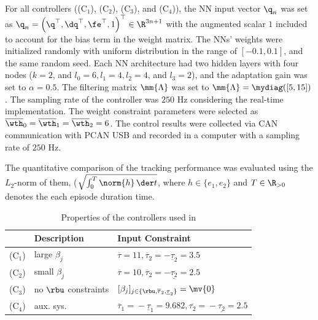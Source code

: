 \documentclass[lettersize,journal]{IEEEtran}
\begin{document}
\hfill

For all controllers ((C$_1$), (C$_2$), (C$_3$), and (C$_4$)), the NN input vector ${\q}_n$ was set as ${\q}_n=\left(\q^\top,\dq^\top,\fe^\top,1\right)^\top\in\R^{3n+1}$ with the augmented scalar $1$ included to account for the bias term in the weight matrix. 
The NNs' weights were initialized randomly with uniform distribution in the range of $[-0.1,0.1]$, and the same random seed.
Each NN architecture had two hidden layers with four nodes (\ie $k=2$, and $l_0=6, l_1=4, l_2=4$, and $l_3=2$), and the adaptation gain was set to $\alpha=0.5$.
The filtering matrix $\mm{\Lambda}$ was set to $\mm{\Lambda}=\mydiag([5,15])$.
The sampling rate of the controller was $250$ Hz considering the real-time implementation.
The weight constraint parameters were selected as $\overline\wth_0=\overline\wth_1=\overline\wth_2=6$. 
The control results were collected via CAN communication with PCAN USB  and recorded in a computer with a sampling rate of $250$ Hz.

The quantitative comparison of the tracking performance was evaluated using the $L_2$-norm of them, (\ie $\sqrt{\int_0^T\norm{h}\,\der t}$, where $h\in\{e_1,e_2\}$ and $T\in\R_{>0}$ denotes the each episode duration time.

\begin{table}[t]
    \renewcommand{\arraystretch}{1.3}
    \caption{Properties of the controllers used in }
    \label{table:controller}
    \centering
    \begin{tabular}{c l l}
    \hline
        \!&\!\bf{Description}\!&\!\bf{Input Constraint}\!\\
    \hline
    \hline
        (C$_1$)\!&\!large $\beta_j$\!&\!$\overline{\tau}=11,\overline{\tau}_2=-\underline{\tau}_2=3.5$ \\
    \hline
        (C$_2$)\!&\!small $\beta_j$\!&\!$\overline{\tau}=10,\overline{\tau}_2=-\underline{\tau_2}=2.5$ \\
    \hline
        (C$_3$)\!&\!no $\rbu$ constraints\!&\!$[\beta_j]_{j\in\{\rbu,\overline{\tau}_2,\underline{\tau}_2\}}=\mv{0}$ \\
    \hline
        (C$_4$)\!&\!aux. sys.\!&\!$\overline{\tau}_1\!=\!-\underline{\tau}_1\!=\!9.682,\overline{\tau_2}\!=\!-\underline{\tau_2}\!=\!2.5$\!\\
    \hline
    \end{tabular}
    \label{table:controllers}
\end{table}
\end{document}
